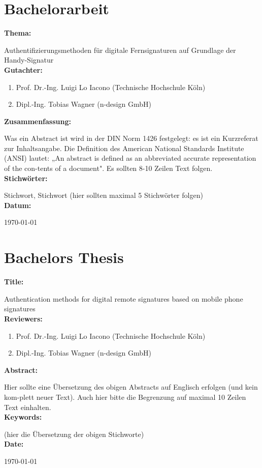 \chapter*{Bachelorarbeit}
\textbf{Thema:}

Authentifizierungsmethoden für digitale Fernsignaturen auf Grundlage der Handy-Signatur
\\[4ex]
\textbf{Gutachter:}
\begin{enumerate}
    \item Prof. Dr.-Ing. Luigi Lo Iacono (Technische Hochschule Köln)
    \item Dipl.-Ing. Tobias Wagner (n-design GmbH)
\end{enumerate}
\textbf{Zusammenfassung:}

Was ein Abstract ist wird in der DIN Norm 1426 festgelegt: es ist ein Kurzreferat zur Inhaltsangabe. Die Definition des American National Standards Institute (ANSI) lautet: „An abstract is defined as an abbreviated accurate representation of the con-tents of a document". Es sollten 8-10 Zeilen Text folgen.
\\[4ex]
\textbf{Stichwörter:}

Stichwort, Stichwort (hier sollten maximal 5 Stichwörter folgen)
\\[4ex]
\textbf{Datum:}

\today
\clearpage

\chapter*{Bachelors Thesis}
\textbf{Title:}

Authentication methods for digital remote signatures based on mobile phone signatures
\\[4ex]
\textbf{Reviewers:}
\begin{enumerate}
    \item Prof. Dr.-Ing. Luigi Lo Iacono (Technische Hochschule Köln)
    \item Dipl.-Ing. Tobias Wagner (n-design GmbH)
\end{enumerate}
\textbf{Abstract:}

Hier sollte eine Übersetzung des obigen Abstracts auf Englisch erfolgen (und kein kom-plett neuer Text). Auch hier bitte die Begrenzung auf maximal 10 Zeilen Text einhalten.
\\[4ex]
\textbf{Keywords:}

(hier die Übersetzung der obigen Stichworte)
\\[4ex]
\textbf{Date:}

\today
\clearpage